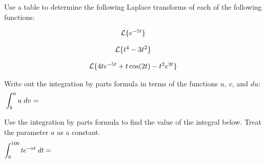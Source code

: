 

\begin{problem}
\item Use a table to determine the following Laplace transforms of
  each of the following functions:

  \begin{subproblem}
  \item 
    \begin{eqnarray}
      \laplace{e^{-5t}}
    \end{eqnarray}
    \vfill

  \item 
    \begin{eqnarray}
      \laplace{t^4-3t^2}
    \end{eqnarray}
    \vfill
      
  \item 
    \begin{eqnarray}
      \laplace{4te^{-5t} + t\cos(2t) - t^2e^{3t}}
    \end{eqnarray}
    \vfill

  \end{subproblem}

  \clearpage

\item Write out the integration by parts formula in terms of the
  functions $u$, $v$, and $du$:
  \begin{eqnarray}
      \int^a_b u \; dv  = && \hspace*{30em}  \nonumber
  \end{eqnarray}

  \vfill

\item Use the integration by parts formula to find the value of the
  integral below.  Treat the parameter $a$ as a constant.
  \begin{eqnarray}
      \int^{100}_0 t e^{-at} \; dt  = && \hspace*{30em}  \nonumber
  \end{eqnarray}

  \vfill

\end{problem}

